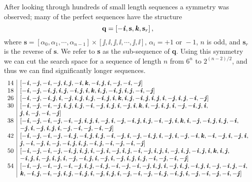 \documentclass[12pt]{article}
\theoremstyle{definition}
\begin{document}
After looking through hundreds of small length sequences a symmetry was observed; many of the perfect
sequences have the structure $$\textbf{q} = \left[-\ii, \textbf{s}, \kk, \textbf{s}_r \right],$$ where 
$\textbf{s} = [\alpha_0, \alpha_1, \cdots, \alpha_{n-1}]\times [\jj,\ii,\jj,\ii,\cdots, \jj, \ii]$, 
$\alpha_i = +1 \text{ or } -1$, $n$ is odd, and $\textbf{s}_r$ is the reverse of $\textbf{s}$. We refer
to \textbf{s} as the sub-sequence of \textbf{q}. Using this symmetry we can cut the search space for a 
sequence of length $n$ from $6^n$ to $2^{(n-2)/2}$, and thus we can find significantly longer sequences.
\[
\begin{array}{r|l}
14 & [-\ii,-\jj,-\ii,-\jj,\ii,\jj,-\ii,\kk,-\ii,\jj,\ii,-\jj,-\ii,-\jj]\\
18 & [-\ii, -\jj, -\ii, \jj, \ii, \jj, -\ii, \jj, \ii, \kk, \ii, \jj, -\ii, \jj, \ii, \jj, -\ii, -\jj]\\
26 & [-\ii, -\jj, -\ii, \jj, \ii, -\jj, \ii, \jj, \ii, \jj, -\ii, \jj, \ii, \kk, \ii, \jj, -\ii, \jj, \ii, \jj, \ii, -\jj, \ii, \jj, -\ii, -\jj]\\
30 & [-\ii, -\jj, -\ii, -\jj, \ii, \jj, \ii, \jj, -\ii, -\jj, \ii, \jj, \ii, -\jj, \ii, \kk, \ii, -\jj, \ii, \jj, \ii, -\jj, -\ii, \jj, \ii, \\
& \jj, \ii, -\jj, -\ii, -\jj]\\
38 & [-\ii, -\jj, -\ii, -\jj, -\ii, -\jj, \ii, \jj, \ii, -\jj, \ii, -\jj, -\ii, \jj, \ii, \jj, -\ii, -\jj, \ii, \kk, \ii, -\jj, -\ii, \jj, \ii, \jj, -\ii, \\
& -\jj, \ii, -\jj, \ii, \jj, \ii, -\jj, -\ii, -\jj, -\ii, -\jj]\\
42 & [-\ii, -\jj, -\ii, -\jj, -\ii, \jj, -\ii, \jj, \ii, \jj, -\ii, -\jj, \ii, -\jj, -\ii, \jj, \ii, -\jj, \ii, -\jj, -\ii, \kk, -\ii, -\jj, \ii, -\jj, \ii,\\ 
& \jj, -\ii, -\jj, \ii, -\jj, -\ii, \jj, \ii, \jj, -\ii, \jj, -\ii, -\jj, -\ii, -\jj]\\
50 & [-\ii, -\jj, -\ii, -\jj, -\ii, \jj, \ii, \jj, \ii, -\jj, \ii, -\jj, \ii, \jj, -\ii, -\jj, \ii, \jj, \ii, -\jj, \ii, \jj, -\ii, \jj, \ii, \kk, \ii, \jj,\\
& -\ii, \jj, \ii, -\jj, \ii, \jj, \ii, -\jj, -\ii, \jj, \ii, -\jj, \ii, -\jj, \ii, \jj, \ii, \jj, -\ii, -\jj, -\ii, -\jj]\\
54 & [-\ii, -\jj, -\ii, -\jj, -\ii, -\jj, \ii, \jj, -\ii, \jj, -\ii, -\jj, -\ii, -\jj, \ii, \jj, \ii, -\jj, \ii, \jj, -\ii, \jj, \ii, -\jj, -\ii, \jj, -\ii, \\
& \kk, -\ii, \jj, -\ii, -\jj, \ii, \jj, -\ii, \jj, \ii, -\jj, \ii, \jj, \ii, -\jj, -\ii, -\jj, -\ii, \jj, -\ii, \jj, \ii, -\jj, -\ii, -\jj, -\ii, -\jj]\\

\end{array}\]
\end{document}
